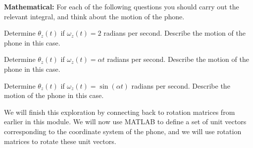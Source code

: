 \documentclass{tufte-handout}
\begin{document}
\be[resume=exercises, label=\textbf{Exercise} (\arabic*)]
\item {\bf Mathematical:} For each of the following questions you should carry out the relevant integral, and think about the motion of the phone.
\be
\item Determine $\theta_z(t)$ if $\omega_z(t) = 2$ radians per second. Describe the motion of the phone in this case.
\item Determine $\theta_z(t)$ if $\omega_z(t) = \alpha t$ radians per second. Describe the motion of the phone in this case.
\item Determine $\theta_z(t)$ if $\omega_z(t) = \sin(\alpha t)$ radians per second. Describe the motion of the phone in this case.
\ee
\ee

We will finish this exploration by connecting back to rotation matrices from earlier in this module. We will now use MATLAB to define a set of unit vectors corresponding to the coordinate system of the phone, and we will use rotation matrices to rotate these unit vectors.
\end{document}
